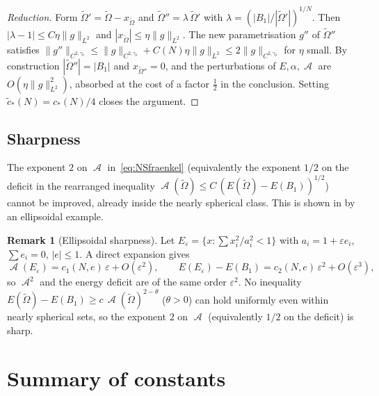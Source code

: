 \documentclass[11pt]{article}
\theoremstyle{definition}
\newtheorem{remark}[theorem]{Remark}
\DeclareMathOperator{\Asym}{\mathcal{A}}
\newcommand{\Ot}{\widetilde{\Omega}}
\begin{document}
\begin{proof}[Reduction]
Form $\Ot'=\Ot-x_{\Ot}$ and $\Ot''=\lambda\,\Ot'$ with
$\lambda=(|B_1|/|\Ot'|)^{1/N}$. Then $|\lambda-1|\le C\eta\|g\|_{L^2}$
and $|x_{\Ot}|\le\eta\|g\|_{L^2}$. The new parametrisation $g''$ of
$\Ot''$ satisfies
$\|g''\|_{C^{2,\gamma_0}}\le\|g\|_{C^{2,\gamma_0}}
+C(N)\eta\|g\|_{L^2}\le 2\|g\|_{C^{2,\gamma_0}}$ for $\eta$ small. By
construction $|\Ot''|=|B_1|$ and $x_{\Ot''}=0$, and the perturbations of
$E,\alpha,\Asym$ are $O(\eta\|g\|_{L^2}^{2})$, absorbed at the cost of a
factor $\tfrac12$ in the conclusion. Setting
$\widetilde{c}_*(N)=c_*(N)/4$ closes the argument.
\end{proof}

\subsection{Sharpness}

The exponent $2$ on $\Asym$ in~\eqref{eq:NSfraenkel} (equivalently the
exponent $1/2$ on the deficit in the rearranged inequality
$\Asym(\Ot)\le C\,(E(\Ot)-E(B_1))^{1/2}$) cannot be improved, already
inside the nearly spherical class. This is shown in \cite[p.~2 and the
discussion preceding \S2]{BDV2013} by an ellipsoidal example.

\begin{remark}[Ellipsoidal sharpness]\label{rem:ellipsoid}
Let $E_\varepsilon=\{x:\sum x_i^{2}/a_i^{2}<1\}$ with $a_i=1+\varepsilon
e_i$, $\sum e_i=0$, $|e|\le 1$. A direct expansion gives
\[
\Asym(E_\varepsilon)=c_1(N,e)\,\varepsilon+O(\varepsilon^{2}),\qquad
E(E_\varepsilon)-E(B_1)=c_2(N,e)\,\varepsilon^{2}+O(\varepsilon^{3}),
\]
so $\Asym^{2}$ and the energy deficit are of the same order
$\varepsilon^{2}$. No inequality
$E(\Ot)-E(B_1)\ge c\,\Asym(\Ot)^{2-\theta}$ ($\theta>0$) can hold
uniformly even within nearly spherical sets, so the exponent $2$ on
$\Asym$ (equivalently $1/2$ on the deficit) is sharp.
\end{remark}

\section{Summary of constants}\label{sec:constants}
\end{document}
